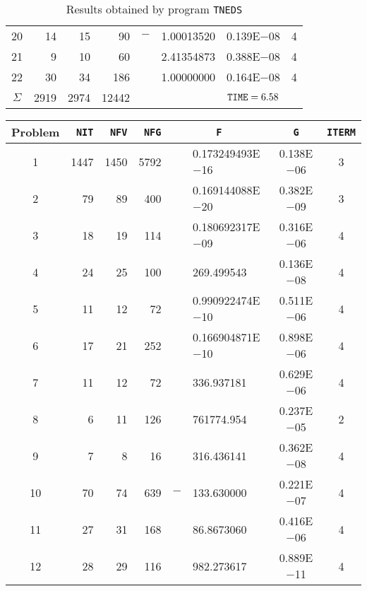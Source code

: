 \documentclass{esub2acm}
\begin{document}
\begin{table}
\begin{tabular}{c|rrrr@{}lcc}
20  &   14  &   15  &   90  &   $-$ &   1.00013520  &   0.139E$-$08 &   4   \\
21  &   9   &   10  &   60  &       &   2.41354873  &   0.388E$-$08 &   4   \\
22  &   30  &   34  &   186 &       &   1.00000000  &   0.164E$-$08 &   4   \\ \hline
$\Sigma$\rule[-2pt]{0pt}{12pt}  &   2919    &   2974    &   12442   &       &       &   ${\tt TIME} = 6.58$ &       \\ \hline
\end{tabular}
\caption{Results obtained by program {\tt TNEDS}}
\label{tneds}
\end{table}

\clearpage

\begin{table}
\footnotesize \centering
\begin{tabular}{c|rrrr@{}lcc} \hline
Problem\rule[-2pt]{0pt}{12pt}  & {\tt NIT} & {\tt NFV} & {\tt NFG}
& \multicolumn{2}{c}{\tt F} & {\tt G} & {\tt ITERM} \\ \hline
1\rule[-2pt]{0pt}{12pt} &   1447    &   1450    &   5792    &       &   0.173249493E$-$16   &   0.138E$-$06 &   3   \\
2   &   79  &   89  &   400 &       &   0.169144088E$-$20   &   0.382E$-$09 &   3   \\
3   &   18  &   19  &   114 &       &   0.180692317E$-$09   &   0.316E$-$06 &   4   \\
4   &   24  &   25  &   100 &       &   269.499543  &   0.136E$-$08 &   4   \\
5   &   11  &   12  &   72  &       &   0.990922474E$-$10   &   0.511E$-$06 &   4   \\
6   &   17  &   21  &   252 &       &   0.166904871E$-$10   &   0.898E$-$06 &   4   \\
7   &   11  &   12  &   72  &       &   336.937181  &   0.629E$-$06 &   4   \\
8   &   6   &   11  &   126 &       &   761774.954  &   0.237E$-$05 &   2   \\
9   &   7   &   8   &   16  &       &   316.436141  &   0.362E$-$08 &   4   \\
10  &   70  &   74  &   639 &   $-$ &   133.630000  &   0.221E$-$07 &   4   \\
11  &   27  &   31  &   168 &       &   86.8673060  &   0.416E$-$06 &   4   \\
12  &   28  &   29  &   116 &       &   982.273617  &   0.889E$-$11 &   4   \\

\end{tabular}
\end{table}
\end{document}
